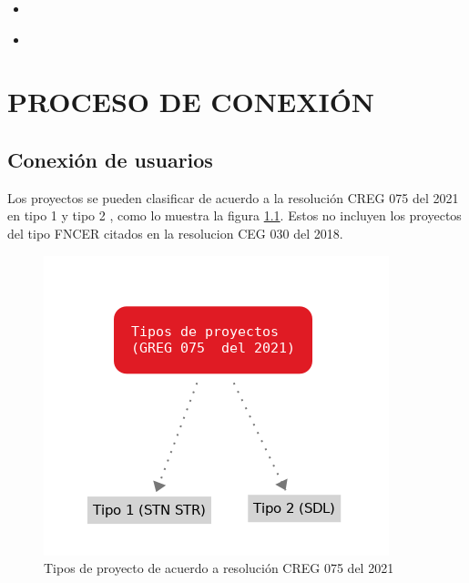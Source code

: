 \documentclass[a5paper]{book}%
\begin{document}
  \begin{itemize}
    
  \item 

 \end{itemize}

\begin{itemize}
\item 

\end{itemize}
  
\chapter{PROCESO DE CONEXIÓN}

\section{Conexión de usuarios}

Los proyectos se pueden clasificar de acuerdo a la resolución CREG 075
del 2021 en tipo 1 y tipo 2 , como lo muestra la figura
\ref{fig:tipoproyecto}. Estos no incluyen los proyectos del tipo
\ac{FNCER} citados en la resolucion CEG 030 del 2018.


\begin{figure}[H]
  \centering \includegraphics[width=1\linewidth]{tipoproyecto}
  \caption{Tipos de proyecto de acuerdo a resolución CREG 075 del
    2021}
  \label{fig:tipoproyecto}
\end{figure}
\end{document}
